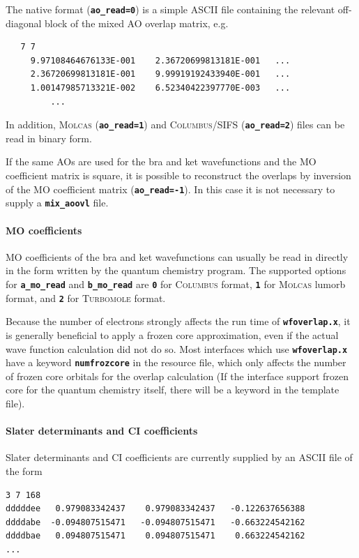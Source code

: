 \documentclass[a4paper,10pt,DIV=15,openany]{scrbook}
\newcommand{\ttt}[1]{\textbf{\texttt{#1}}}
\newenvironment{example}{
  \setlength{\OuterFrameSep}{3pt}
  \vspace{0mm}
  \definecolor{shadecolor}{HTML}{E4F4FF}
  \begin{shaded}
}{
  \end{shaded}
}
\begin{document}
The native format (\ttt{ao\_read=0}) is a simple ASCII file containing the relevant off-diagonal block of the mixed AO overlap matrix, e.g.

\begin{example}
\begin{verbatim}
   7 7
     9.97108464676133E-001    2.36720699813181E-001   ...
     2.36720699813181E-001    9.99919192433940E-001   ...
     1.00147985713321E-002    6.52340422397770E-003   ...
         ...
\end{verbatim}
\end{example}

In addition, \textsc{Molcas} (\ttt{ao\_read=1}) and \textsc{Columbus/SIFS} (\ttt{ao\_read=2}) files can be read in binary form.

If the same AOs are used for the bra and ket wavefunctions and the MO coefficient matrix is square, it is possible to reconstruct the overlaps by inversion of the MO coefficient matrix (\ttt{ao\_read=-1}).
In this case it is not necessary to supply a \ttt{mix\_aoovl} file.

\paragraph{MO coefficients}

MO coefficients of the bra and ket wavefunctions can usually be read in directly in the form written by the quantum chemistry program.
The supported options for \ttt{a\_mo\_read} and \ttt{b\_mo\_read} are \ttt{0} for \textsc{Columbus} format, \ttt{1} for \textsc{Molcas} lumorb format, and \ttt{2} for \textsc{Turbomole} format.

Because the number of electrons strongly affects the run time of \ttt{wfoverlap.x}, it is generally beneficial to apply a frozen core approximation, even if the actual wave function calculation did not do so.
Most interfaces which use \ttt{wfoverlap.x} have a keyword \ttt{numfrozcore} in the resource file, which only affects the number of frozen core orbitals for the overlap calculation (If the interface support frozen core for the quantum chemistry itself, there will be a keyword in the template file).


\paragraph{Slater determinants and CI coefficients}

Slater determinants and CI coefficients are currently supplied by an ASCII file of the form
%
\begin{example}
\begin{verbatim}
3 7 168
dddddee   0.979083342437    0.979083342437   -0.122637656388
ddddabe  -0.094807515471   -0.094807515471   -0.663224542162
ddddbae   0.094807515471    0.094807515471    0.663224542162
...
\end{verbatim}
\end{example}
\end{document}
